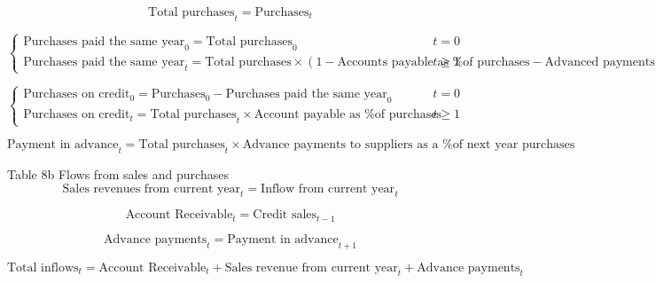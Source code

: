 \documentclass[12pt]{article}
\numberwithin{equation}{section}
\begin{document}
\begin{equation}
	\text{Total purchases}_{t} = \text{Purchases}_{t}
\end{equation}

\begin{equation}
	\begin{cases}
		\text{Purchases paid the same year}_{0} = \text{Total purchases}_{0} & t=0 \\
		\text{Purchases paid the same year}_{t} = \text{Total purchases} \times \left(1 - \text{Accounts payable as \% of purchases} - \text{Advanced payments from customers as \% of next year sales}\right) & t\geq1
	\end{cases}
\end{equation}

\begin{equation}
	\begin{cases}
		\text{Purchases on credit}_{0} = \text{Purchases}_{0} - \text{Purchases paid the same year}_{0} & t=0 \\
		\text{Purchases on credit}_{t} = \text{Total purchases}_{t} \times \text{Account payable as \% of purchases} & t\geq1
	\end{cases}
\end{equation}

\begin{equation}
	\text{Payment in advance}_{t} = \text{Total purchases}_{t} \times \text{Advance payments to suppliers as a \% of next year purchases}
\end{equation}


Table 8b Flows from sales and purchases
\begin{equation}
	\text{Sales revenues from current year}_{t} = \text{Inflow from current year}_{t}
\end{equation}

\begin{equation}
	\text{Account Receivable}_{t} = \text{Credit sales}_{t-1}
\end{equation}

\begin{equation}
	\text{Advance payments}_{t} = \text{Payment in advance}_{t+1}
\end{equation}

\begin{equation}
	\text{Total inflows}_{t} = \text{Account Receivable}_{t} + \text{Sales revenue from current year}_{t} + \text{Advance payments}_{t}
\end{equation}
\end{document}
